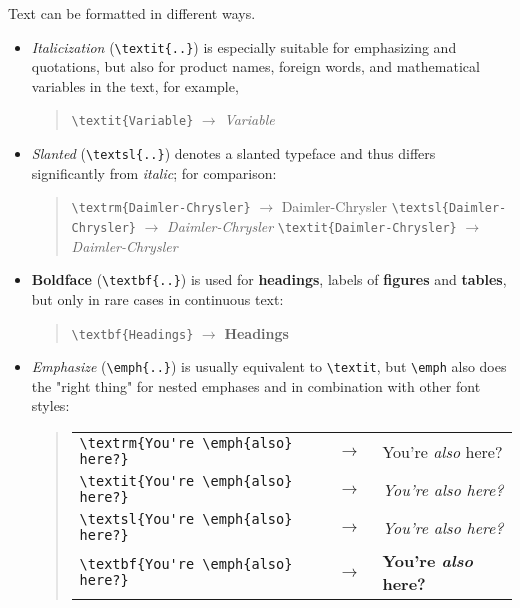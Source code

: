 Text can be formatted in different ways.
%
\begin{itemize}
    \item \textit{Italicization} (\verb!\textit{..}!) is especially suitable for
    emphasizing and quotations, but also for product names, foreign words, and
    mathematical variables in the text, for example,
    \begin{quote}
        \verb!\textit{Variable}! $\rightarrow$ \textit{Variable}
    \end{quote}
%
    \item \textsl{Slanted} (\verb!\textsl{..}!) denotes a slanted typeface and
    thus differs significantly from \textit{italic}; for comparison:
    \begin{quote}
        \verb!\textrm{Daimler-Chrysler}! $\rightarrow$
        \textrm{Daimler-Chrysler} \newline%
        \verb!\textsl{Daimler-Chrysler}! $\rightarrow$
        \textsl{Daimler-Chrysler} \newline%
        \verb!\textit{Daimler-Chrysler}! $\rightarrow$ \textit{Daimler-Chrysler}
    \end{quote}
%
    \item \textbf{Boldface} (\verb!\textbf{..}!) is used for \textbf{headings},
    labels of \textbf{figures} and \textbf{tables}, but only in rare cases in
    continuous text:
    \begin{quote}
        \verb!\textbf{Headings}! $\rightarrow$ \textbf{Headings}
    \end{quote}
%
    \item \emph{Emphasize} (\verb!\emph{..}!) is usually equivalent to
    \verb!\textit!, but \verb!\emph! also does the "right thing" for nested
    emphases and in combination with other font styles:
    \begin{quote}
        \setlength{\tabcolsep}{0pt}%
        \begin{tabular}{lcl}
            \verb!\textrm{You're \emph{also} here?}! & $\;\rightarrow\;$ &
            \textrm{You're \emph{also} here?} \\
            \verb!\textit{You're \emph{also} here?}! & $\;\rightarrow\;$ &
            \textit{You're \emph{also} here?} \\
            \verb!\textsl{You're \emph{also} here?}! & $\;\rightarrow\;$ &
            \textsl{You're \emph{also} here?} \\
            \verb!\textbf{You're \emph{also} here?}! & $\;\rightarrow\;$ &
            \textbf{You're \emph{also} here?} \\

\end{tabular}
\end{quote}
\end{itemize}

